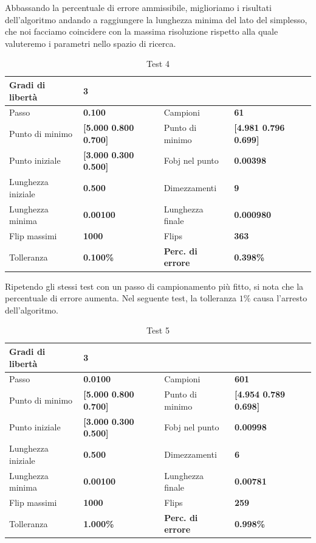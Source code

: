 \documentclass[a4paper, 11pt]{article}
\begin{document}
\noindent
Abbassando la percentuale di errore ammissibile, miglioriamo i risultati
dell'algoritmo andando a raggiungere la lunghezza minima del lato del simplesso,
che noi facciamo coincidere con la massima risoluzione rispetto alla quale
valuteremo i parametri nello spazio di ricerca.

\begin{table}[h] 
    \caption{Test 4}
    \begin{center}
    \begin{tabular}{|l|l|l|l|} 
    \hline 
Gradi di libertà & \textbf{3} &  &  \\ \hline 
Passo & \textbf{0.100} & Campioni & \textbf{61} \\ \hline 
Punto di minimo & \textbf{{[}5.000 0.800 0.700{]}} & Punto di minimo &
\textbf{{[}4.981 0.796 0.699{]}} \\ \hline 
Punto iniziale & \textbf{{[}3.000 0.300 0.500{]}} & Fobj nel punto &
\textbf{0.00398} \\ \hline 
Lunghezza iniziale & \textbf{0.500} & Dimezzamenti & \textbf{9} \\ \hline 
Lunghezza minima & \textbf{0.00100} & Lunghezza finale & \textbf{0.000980} \\
\hline
Flip massimi & \textbf{1000} & Flips & \textbf{363} \\ \hline 
Tolleranza & \textbf{0.100\%} & \textbf{Perc. di errore} & \textbf{0.398\%} \\
\hline 
    \end{tabular} 
    \end{center}
    \end{table}

\noindent
Ripetendo gli stessi test con un passo di campionamento più fitto, si nota che
la percentuale di errore aumenta. Nel seguente test, la tolleranza $1\%$ causa
l'arresto dell'algoritmo.

\begin{table}[h] 
    \caption{Test 5}
    \begin{center}
    \begin{tabular}{|l|l|l|l|} 
    \hline 
Gradi di libertà & \textbf{3} &  &  \\ \hline 
Passo & \textbf{0.0100} & Campioni & \textbf{601} \\ \hline 
Punto di minimo & \textbf{{[}5.000 0.800 0.700{]}} & Punto di minimo &
\textbf{{[}4.954 0.789 0.698{]}} \\ \hline 
Punto iniziale & \textbf{{[}3.000 0.300 0.500{]}} & Fobj nel punto &
\textbf{0.00998} \\ \hline 
Lunghezza iniziale & \textbf{0.500} & Dimezzamenti & \textbf{6} \\ \hline 
Lunghezza minima & \textbf{0.00100} & Lunghezza finale & \textbf{0.00781} \\
\hline
Flip massimi & \textbf{1000} & Flips & \textbf{259} \\ \hline 
Tolleranza & \textbf{1.000\%} & \textbf{Perc. di errore} & \textbf{0.998\%} \\
\hline 
    \end{tabular} 
    \end{center}
    \end{table}
\end{document}
